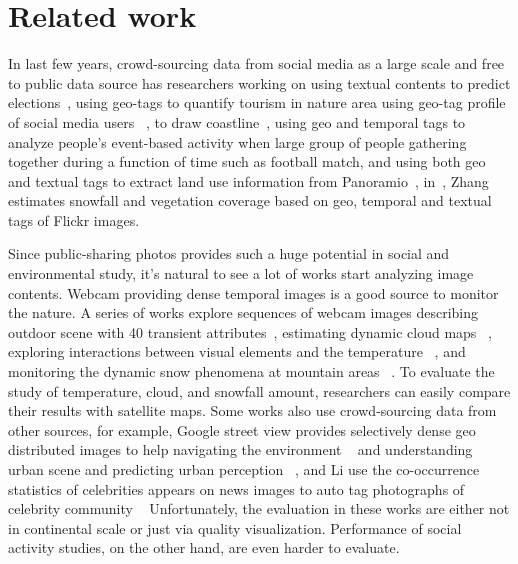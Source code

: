 \section{Related work}
In last few years, crowd-sourcing data from social media 
as a large scale and free to public data source
has  
researchers working on using textual contents to
predict elections~\cite{you2015multifacetedelections},
using geo-tags to quantify
tourism in nature area using geo-tag profile of social media users ~\cite{wood2013usingtourism},
to draw coastline~\cite{omori2014can},
using geo and temporal tags to analyze people's event-based activity 
when large group of people gathering together during a function of time 
such as football match,
and using both geo and textual tags to 
extract land use information from Panoramio~\cite{vsecerov2015analysis, oba2014towards}, 
in~\cite{ecology2012www}, 
Zhang \etal estimates snowfall and vegetation coverage 
based on geo, temporal and textual tags of Flickr images. 

Since public-sharing photos provides such a huge potential in social and environmental study, it's 
natural to see a lot of works start analyzing image contents. Webcam providing dense temporal images 
is a good source to monitor the nature. A series of works explore sequences 
of webcam images describing outdoor scene with 40 transient attributes~\cite{laffont2014transient}, estimating dynamic cloud maps ~\cite{murdock2015building, murdock}, exploring interactions between visual elements and the temperature  ~\cite{glasner2015hot}, 
and monitoring the dynamic snow phenomena at mountain areas ~\cite{fedorov2015snowwatch, fedorov2014snow}. 
To evaluate the study of temperature, cloud, and snowfall amount,
 researchers can easily compare their results with satellite maps. 
Some works also use crowd-sourcing data from other sources, for example, Google street view provides selectively dense geo distributed images to help navigating the environment ~\cite{khosla2014looking} and understanding urban scene and predicting urban perception ~\cite{porzi2015predicting}, and Li \etal use the co-occurrence statistics of celebrities appears on news images to auto tag photographs of celebrity community ~\cite{li2015celebritynet}
Unfortunately, 
the evaluation in these works are either not in continental scale or just via quality visualization.
Performance of social activity studies, on the other hand, are even harder to evaluate.

